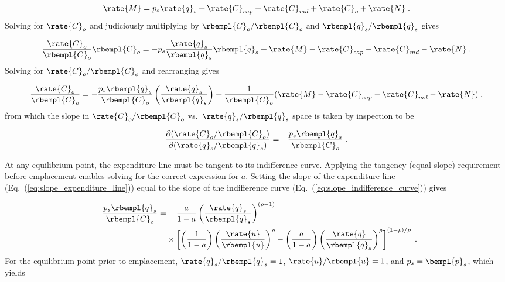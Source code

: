 \begin{equation}
  \rate{M} = p_s \rate{q}_s + \rate{C}_{cap} + \rate{C}_{md} + \rate{C}_o  + \rate{N} \; . 
\end{equation}
%
Solving for $\rate{C}_o$ and judiciously multiplying by $\rbempl{C}_o/\rbempl{C}_o$
and $\rbempl{q}_s/\rbempl{q}_s$ gives

\begin{equation}
  \frac{\rate{C}_o}{\rbempl{C}_o} \rbempl{C}_o = - p_s \frac{\rate{q}_s}{\rbempl{q}_s} \rbempl{q}_s
                        + \rate{M} - \rate{C}_{cap} - \rate{C}_{md}  - \rate{N} \; .
\end{equation}
%
Solving for $\rate{C}_o/\rbempl{C}_o$ and rearranging gives

\begin{equation}
  \frac{\rate{C}_o}{\rbempl{C}_o} = - \frac{p_s \rbempl{q}_s}{\rbempl{C}_o}  
                                        \left( \frac{\rate{q}_s}{\rbempl{q}_s}   \right)
                                    + \frac{1}{\rbempl{C}_o}
                                          (\rate{M} - \rate{C}_{cap} - \rate{C}_{md} - \rate{N}) \; ,
\end{equation}
%
from which the slope in $\rate{C}_o/\rbempl{C}_o$ vs.\ $\rate{q}_s/\rbempl{q}_s$ space
is taken by inspection to be

\begin{equation} \label{eq:slope_expenditure_line}
  \frac{\partial (\rate{C}_o/\rbempl{C}_o)}{\partial (\rate{q}_s/\rbempl{q}_s)} =
              - \frac{p_s \rbempl{q}_s}{\rbempl{C}_o} \; .
\end{equation}

At any equilibrium point, the expenditure line must be tangent to its indifference curve.
Applying the tangency (equal slope) requirement before emplacement enables 
solving for the correct expression for $a$.
Setting the slope of the expenditure line (Eq.~(\ref{eq:slope_expenditure_line}))
equal to the slope of the indifference curve (Eq.~(\ref{eq:slope_indifference_curve})) gives

\begin{align}
  - \frac{p_s \rbempl{q}_s}{\rbempl{C}_o} =& 
        -\frac{a}{1 - a} \left( \frac{\rate{q}_s}{\rbempl{q}_s} \right)^{(\rho -1)} \nonumber \\
        &\times \left[ \left( \frac{1}{1 - a} \right) \left( \frac{\rate{u}}{\rbempl{u}} \right)^\rho
                - \left( \frac{a}{1 - a} \right) 
                          \left( \frac{\rate{q}}{\rbempl{q}_s} \right)^\rho \right]^{(1 - \rho)/\rho} \; .
\end{align}
%
For the equilibrium point 
prior to emplacement, $\rate{q}_s/\rbempl{q}_s = 1$, $\rate{u}/\rbempl{u} = 1$, and
$p_s = \bempl{p}_s$, which yields

